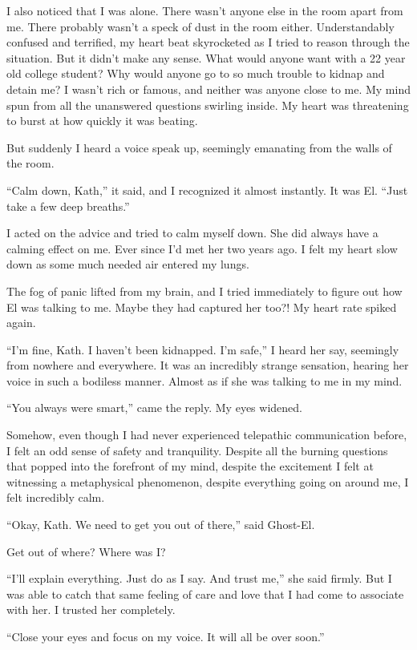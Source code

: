 I also noticed that I was alone. There wasn’t anyone else in the room apart from me. There probably wasn’t a speck of dust in the room either. Understandably confused and terrified, my heart beat skyrocketed as I tried to reason through the situation. 
But it didn’t make any sense. What would anyone want with a 22 year old college student? Why would anyone go to so much trouble to kidnap and detain me? I wasn’t rich or famous, and neither was anyone close to me. My mind spun from all the unanswered questions swirling inside. My heart was threatening to burst at how quickly it was beating. 

But suddenly I heard a voice speak up, seemingly emanating from the walls of the room.

“Calm down, Kath,” it said, and I recognized it almost instantly. It was El. “Just take a few deep breaths.”

I acted on the advice and tried to calm myself down. She did always have a calming effect on me. Ever since I’d met her two years ago. I felt my heart slow down as some much needed air entered my lungs. 

The fog of panic lifted from my brain, and I tried immediately to figure out how El was talking to me. Maybe they had captured her too?! My heart rate spiked again.

“I’m fine, Kath. I haven’t been kidnapped. I’m safe,” I heard her say, seemingly from nowhere and everywhere. It was an incredibly strange sensation, hearing her voice in such a bodiless manner. Almost as if she was talking to me in my mind. 

“You always were smart,” came the reply. My eyes widened.

Somehow, even though I had never experienced telepathic communication before, I felt an odd sense of safety and tranquility. Despite all the burning questions that popped into the forefront of my mind, despite the excitement I felt at witnessing a metaphysical phenomenon, despite everything going on around me, I felt incredibly calm.

“Okay, Kath. We need to get you out of there,” said Ghost-El. 

Get out of where? Where was I? 

“I’ll explain everything. Just do as I say. And trust me,” she said firmly. But I was able to catch that same feeling of care and love that I had come to associate with her. I trusted her completely.

“Close your eyes and focus on my voice. It will all be over soon.” 

